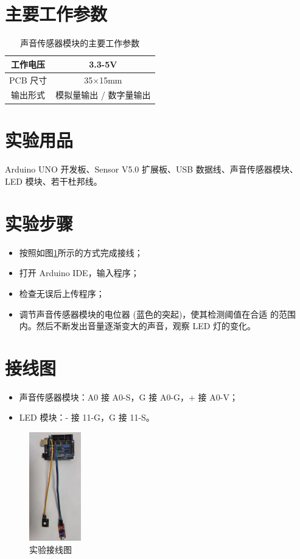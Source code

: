 \documentclass[UTF8, oneside]{ctexbook}
\begin{document}
\section{主要工作参数}
\begin{table}[h]
    \centering
    \begin{tabular}{|c|c|}
    \hline
    工作电压   & 3.3-5V         \\ \hline
    PCB 尺寸 & 35$\times$15mm \\ \hline
    输出形式   & 模拟量输出 / 数字量输出  \\ \hline
    \end{tabular}
    \caption{声音传感器模块的主要工作参数}
\end{table}

\section{实验用品}
\paragraph{}
Arduino UNO 开发板、Sensor V5.0 扩展板、USB 数据线、声音传感器模块、LED 模块、若干杜邦线。

\section{实验步骤}
\begin{itemize}
    \item[(1)] 按照如图\ref{s21_line}所示的方式完成接线；
    \item[(2)] 打开 Arduino IDE，输入程序；
    \item[(3)] 检查无误后上传程序；
    \item[(4)]  调节声音传感器模块的电位器 (蓝色的突起)，使其检测阈值在合适
    的范围内。然后不断发出音量逐渐变大的声音，观察 LED 灯的变化。
\end{itemize}

\section{接线图}
\begin{itemize}
    \item 声音传感器模块：A0 接 A0-S，G 接 A0-G，+ 接 A0-V；
    \item LED 模块：- 接 11-G，G 接 11-S。
\end{itemize}
\begin{figure}[h]
    \centering
    \includegraphics[width=0.2\textwidth]{./result/sensor/21/lines2.png}
    \caption{实验接线图}
    \label{s21_line}
\end{figure}
\end{document}
